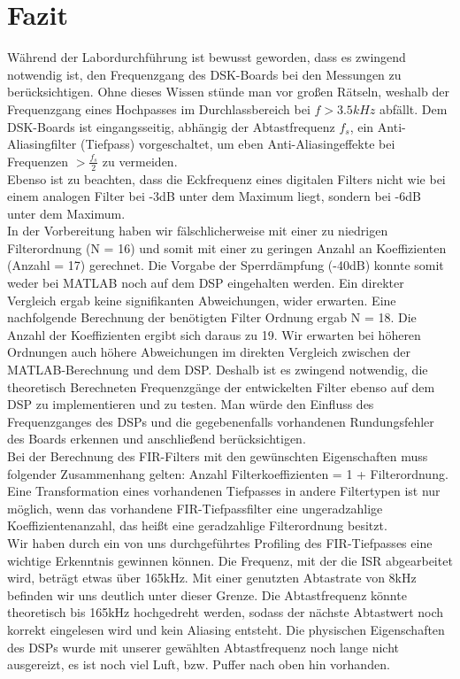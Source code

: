\section{Fazit}
\noindent Während der Labordurchführung ist bewusst geworden, dass es zwingend notwendig ist, den Frequenzgang des DSK-Boards bei den Messungen zu berücksichtigen. Ohne dieses Wissen stünde man vor großen Rätseln, weshalb der Frequenzgang eines Hochpasses im Durchlassbereich bei $f>3.5kHz$ abfällt. Dem DSK-Boards ist eingangsseitig, abhängig der Abtastfrequenz $f_s$, ein Anti-Aliasingfilter (Tiefpass) vorgeschaltet, um eben Anti-Aliasingeffekte bei Frequenzen $>\frac{f_s}{2}$ zu vermeiden.\\
\noindent Ebenso ist zu beachten, dass die Eckfrequenz eines digitalen Filters nicht wie bei einem analogen Filter bei -3dB unter dem Maximum liegt, sondern bei -6dB unter dem Maximum.\\
\noindent In der Vorbereitung haben wir fälschlicherweise mit einer zu niedrigen Filterordnung (N = 16) und somit mit einer zu geringen Anzahl an Koeffizienten (Anzahl = 17) gerechnet. Die Vorgabe der Sperrdämpfung (-40dB) konnte somit weder bei MATLAB noch auf dem DSP eingehalten werden. Ein direkter Vergleich ergab keine signifikanten Abweichungen, wider erwarten. Eine nachfolgende Berechnung der benötigten Filter Ordnung ergab N = 18. Die Anzahl der Koeffizienten ergibt sich daraus zu 19. Wir erwarten bei höheren Ordnungen auch höhere Abweichungen im direkten Vergleich zwischen der MATLAB-Berechnung und dem DSP. Deshalb ist es zwingend notwendig, die theoretisch Berechneten Frequenzgänge der entwickelten Filter ebenso auf dem DSP zu implementieren und zu testen. Man würde den Einfluss des Frequenzganges des DSPs und die gegebenenfalls vorhandenen Rundungsfehler des Boards erkennen und anschließend berücksichtigen.\\
\noindent Bei der Berechnung des FIR-Filters mit den gewünschten Eigenschaften muss folgender Zusammenhang gelten: Anzahl Filterkoeffizienten = 1 + Filterordnung. Eine Transformation eines vorhandenen Tiefpasses in andere Filtertypen ist nur möglich, wenn das vorhandene FIR-Tiefpassfilter eine ungeradzahlige Koeffizientenanzahl, das heißt eine geradzahlige Filterordnung besitzt.\\
\noindent Wir haben durch ein von uns durchgeführtes Profiling des FIR-Tiefpasses eine wichtige Erkenntnis gewinnen können. Die Frequenz, mit der die ISR abgearbeitet wird, beträgt etwas über 165kHz. Mit einer genutzten Abtastrate von 8kHz befinden wir uns deutlich unter dieser Grenze. Die Abtastfrequenz könnte theoretisch bis 165kHz hochgedreht werden, sodass der nächste Abtastwert noch korrekt eingelesen wird und kein Aliasing entsteht. Die physischen Eigenschaften des DSPs wurde mit unserer gewählten Abtastfrequenz noch lange nicht ausgereizt, es ist noch viel Luft, bzw. Puffer nach oben hin vorhanden. 
